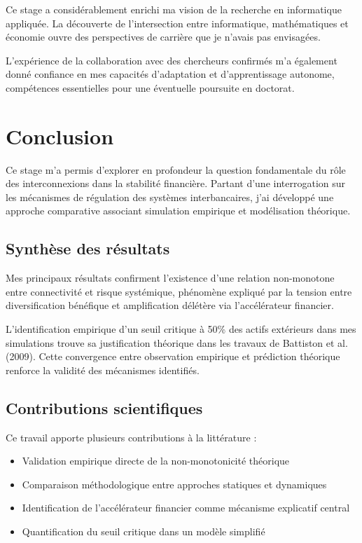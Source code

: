 \documentclass[12pt,a4paper,twoside]{article}
\begin{document}
Ce stage a considérablement enrichi ma vision de la recherche en informatique appliquée. La découverte de l'intersection entre informatique, mathématiques et économie ouvre des perspectives de carrière que je n'avais pas envisagées.

L'expérience de la collaboration avec des chercheurs confirmés m'a également donné confiance en mes capacités d'adaptation et d'apprentissage autonome, compétences essentielles pour une éventuelle poursuite en doctorat.

\section{Conclusion}

Ce stage m'a permis d'explorer en profondeur la question fondamentale du rôle des interconnexions dans la stabilité financière. Partant d'une interrogation sur les mécanismes de régulation des systèmes interbancaires, j'ai développé une approche comparative associant simulation empirique et modélisation théorique.

\subsection{Synthèse des résultats}

Mes principaux résultats confirment l'existence d'une relation non-monotone entre connectivité et risque systémique, phénomène expliqué par la tension entre diversification bénéfique et amplification délétère via l'accélérateur financier.

L'identification empirique d'un seuil critique à 50\% des actifs extérieurs dans mes simulations trouve sa justification théorique dans les travaux de Battiston et al. (2009). Cette convergence entre observation empirique et prédiction théorique renforce la validité des mécanismes identifiés.

\subsection{Contributions scientifiques}

Ce travail apporte plusieurs contributions à la littérature :
\begin{itemize}
\item Validation empirique directe de la non-monotonicité théorique
\item Comparaison méthodologique entre approches statiques et dynamiques  
\item Identification de l'accélérateur financier comme mécanisme explicatif central
\item Quantification du seuil critique dans un modèle simplifié
\end{itemize}
\end{document}
